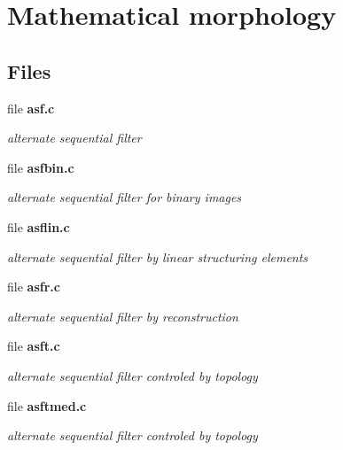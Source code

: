 \section{Mathematical morphology}
\label{group__morpho}
\subsection*{Files}
\begin{CompactItemize}
\item 
file {\bf asf.c}
\begin{CompactList}\small\item\em alternate sequential filter \item\end{CompactList}

\item 
file {\bf asfbin.c}
\begin{CompactList}\small\item\em alternate sequential filter for binary images \item\end{CompactList}

\item 
file {\bf asflin.c}
\begin{CompactList}\small\item\em alternate sequential filter by linear structuring elements \item\end{CompactList}

\item 
file {\bf asfr.c}
\begin{CompactList}\small\item\em alternate sequential filter by reconstruction \item\end{CompactList}

\item 
file {\bf asft.c}
\begin{CompactList}\small\item\em alternate sequential filter controled by topology \item\end{CompactList}

\item 
file {\bf asftmed.c}
\begin{CompactList}\small\item\em alternate sequential filter controled by topology \item\end{CompactList}


\end{CompactItemize}

